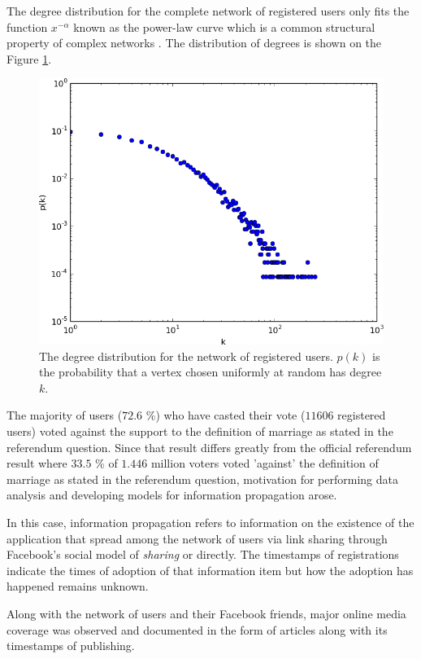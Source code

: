 \documentclass[times, utf8, zavrsni]{fer}
\begin{document}
The degree distribution for the complete network of registered users only fits the function $x^{-\alpha}$ known as the power-law curve which is a common structural property of complex networks \cite{Newman03thestructure}. The distribution of degrees is shown on the Figure \ref{degs}.

\begin{figure}[htp]
\centering
\includegraphics[scale=0.6]{figs/log_mali.png}	
\caption{The degree distribution for the network of registered users. $p(k)$ is the probability that a vertex chosen uniformly at random has degree $k$.}
\label{degs}
\end{figure}

 The majority of users ($72.6$ \%)  who have casted their vote ($11606$ registered users) voted against the support to the definition of marriage as stated in the referendum question. Since that result differs greatly from the official referendum result where $33.5$ \% of $1.446$ million voters voted 'against' the definition of marriage as stated in the referendum question, motivation for performing data analysis and developing models for information propagation arose. 
 
 In this case, information propagation refers to  information on the existence of the application that  spread among the network of users via link sharing through Facebook's social model of \emph{sharing} or directly. The timestamps of registrations indicate the times of adoption of that information item but how the adoption has happened remains unknown.  
   
 Along with the network of users and their Facebook friends, major online media coverage was observed and documented in the form of articles  along with its timestamps of publishing.
 
\end{document}
